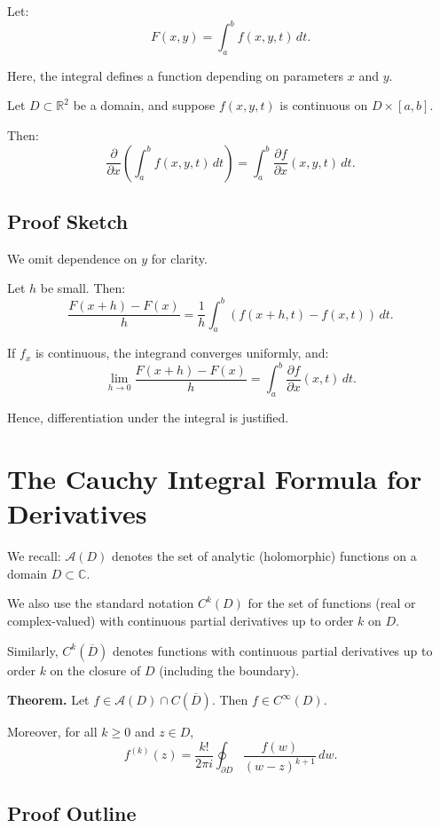 \documentclass[12pt]{article}
\theoremstyle{definition} %
\theoremstyle{plain} %
\begin{document}
Let:
\[
F(x, y) = \int_a^b f(x, y, t)\,dt.
\]

Here, the integral defines a function depending on parameters $x$ and $y$.

Let $D \subset \mathbb{R}^2$ be a domain, and suppose $f(x, y, t)$ is continuous on $D \times [a, b]$.

Then:
\[
\frac{\partial}{\partial x} \left( \int_a^b f(x, y, t)\,dt \right) = \int_a^b \frac{\partial f}{\partial x}(x, y, t)\,dt.
\]

\subsection*{Proof Sketch}

We omit dependence on $y$ for clarity.

Let $h$ be small. Then:
\[
\frac{F(x + h) - F(x)}{h} = \frac{1}{h} \int_a^b \left( f(x + h, t) - f(x, t) \right)\,dt.
\]

If $f_x$ is continuous, the integrand converges uniformly, and:
\[
\lim_{h \to 0} \frac{F(x + h) - F(x)}{h} = \int_a^b \frac{\partial f}{\partial x}(x, t)\,dt.
\]

Hence, differentiation under the integral is justified.

\section*{The Cauchy Integral Formula for Derivatives}

We recall: $\mathcal{A}(D)$ denotes the set of analytic (holomorphic) functions on a domain $D \subset \mathbb{C}$.

We also use the standard notation $C^k(D)$ for the set of functions (real or complex-valued) with continuous partial derivatives up to order $k$ on $D$.

Similarly, $C^k(\overline{D})$ denotes functions with continuous partial derivatives up to order $k$ on the closure of $D$ (including the boundary).

\textbf{Theorem.} Let $f \in \mathcal{A}(D) \cap C(\overline{D})$. Then $f \in C^\infty(D)$.

Moreover, for all $k \geq 0$ and $z \in D$,
\[
f^{(k)}(z) = \frac{k!}{2\pi i} \oint_{\partial D} \frac{f(w)}{(w - z)^{k+1}}\,dw.
\]

\subsection*{Proof Outline}
\end{document}
